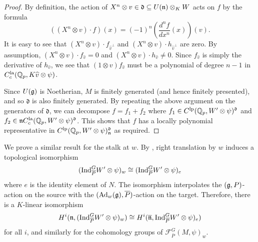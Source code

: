\documentclass[10pt]{amsart}
\begin{document}
\begin{proof}
By definition, the action of $X^{n}\otimes v \in\mathfrak{d}\subseteq U(\mathfrak{n})\otimes_{K}W$ acts on $f$ by the formula \[
    ((X^{n}\otimes v)\cdot f )(x) = (-1)^{n}\left(\frac{d^n f}{dx^{n}}(x)\right)(v).
\] It is easy to see that $(X^{n}\otimes v)\cdot f_{\widehat{v}^{\perp}} $ and $(X^{n}\otimes v)\cdot h_{\widehat{v}^{\perp}}$ are zero. By assumption, $(X^{n}\otimes v)\cdot f_{\widehat{v}}=0$ and $(X^{n}\otimes v)\cdot h_{\widehat{v}} \neq 0$. Since $f_{\widehat{v}}$ is simply the derivative of $h_{\widehat{v}}$, we see that $(1\otimes v)f_{\widehat{v}}$ must be a polynomial of degree $n-1$ in $C^{\textnormal{la}}_{c}(\mathbb{Q}_{p},K\widehat{v}\otimes \psi)$. 

Since $U(\mathfrak{g})$ is Noetherian, $M$ is finitely generated (and hence finitely presented), and so $\mathfrak{d}$ is also finitely generated. By repeating the above argument on the generators of $\mathfrak{d}$, we can decompose $f=f_1+f_2$ where $f_1\in  C^{\textnormal{lp}}(\mathbb{Q}_{p},W^{\prime}\otimes\psi)^{\mathfrak{d}}$ and $f_{2}\in \mathfrak{n}  C^{\textnormal{la}}_{c}(\mathbb{Q}_{p},W^{\prime}\otimes\psi)^{\mathfrak{d}}$. This shows that $f$ has a locally polynomial representative in $C^{\textnormal{lp}}(\mathbb{Q}_{p},W^{\prime}\otimes\psi)^{\mathfrak{d}}_{\mathfrak{n}}$ as required. 
\end{proof}

We prove a similar result for the stalk at $w$. By \cite[Lem. 2.3.5]{Jacquet2}, right translation by $w$ induces a topological isomorphism \begin{equation}\label{eq:change_of_section}
    (\textnormal{Ind}_{\overline{P}}^{G}W^{\prime}\otimes\psi)_{w} \cong (\textnormal{Ind}_{\overline{P}}^{G}W^{\prime}\otimes\psi)_{e}
\end{equation} where $e$ is the identity element of $N$. The isomorphism interpolates the $(\mathfrak{g},P)$-action on the source with the $(\textnormal{Ad}_{w}(\mathfrak{g}),\overline{P})$-action on the target. Therefore, there is a $K$-linear isomorphism \[
    H^{i}(\mathfrak{n},(\textnormal{Ind}_{\overline{P}}^{G}W^{\prime}\otimes\psi)_{w}) \cong H^{i}(\overline{\mathfrak{n}},\textnormal{Ind}_{\overline{P}}^{G}W^{\prime}\otimes\psi)_{e})
\] for all $i$, and similarly for the cohomology groups of $\mathcal{F}_{\overline{P}}^{G}(M,\psi)_{w}$. 
\end{document}

